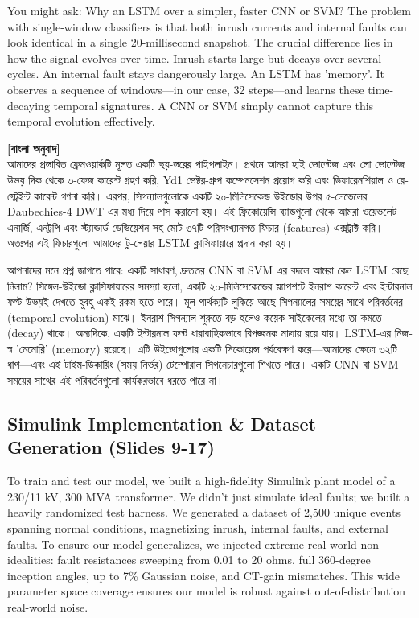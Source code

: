 \documentclass[12pt]{article}
\begin{document}
You might ask: Why an LSTM over a simpler, faster CNN or SVM? The problem with single-window classifiers is that both inrush currents and internal faults can look identical in a single 20-millisecond snapshot. The crucial difference lies in how the signal evolves over time. Inrush starts large but decays over several cycles. An internal fault stays dangerously large. An LSTM has 'memory'. It observes a sequence of windows—in our case, 32 steps—and learns these time-decaying temporal signatures. A CNN or SVM simply cannot capture this temporal evolution effectively.

\begin{bengali}
\textbf{[বাংলা অনুবাদ]} \\
আমাদের প্রস্তাবিত ফ্রেমওয়ার্কটি মূলত একটি ছয়-স্তরের পাইপলাইন। প্রথমে আমরা হাই ভোল্টেজ এবং লো ভোল্টেজ উভয় দিক থেকে ৩-ফেজ কারেন্ট গ্রহণ করি, Yd1 ভেক্টর-গ্রুপ কম্পেনসেশন প্রয়োগ করি এবং ডিফারেনশিয়াল ও রেস্ট্রেইন্ট কারেন্ট গণনা করি। এরপর, সিগন্যালগুলোকে একটি ২০-মিলিসেকেন্ড উইন্ডোর উপর ৫-লেভেলের Daubechies-4 DWT এর মধ্য দিয়ে পাস করানো হয়। এই ফ্রিকোয়েন্সি ব্যান্ডগুলো থেকে আমরা ওয়েভলেট এনার্জি, এনট্রপি এবং স্ট্যান্ডার্ড ডেভিয়েশন সহ মোট ৩৭টি পরিসংখ্যানগত ফিচার (features) এক্সট্রাক্ট করি। অতঃপর এই ফিচারগুলো আমাদের টু-লেয়ার LSTM ক্লাসিফায়ারে প্রদান করা হয়।

আপনাদের মনে প্রশ্ন জাগতে পারে: একটি সাধারণ, দ্রুততর CNN বা SVM এর বদলে আমরা কেন LSTM বেছে নিলাম? সিঙ্গেল-উইন্ডো ক্লাসিফায়ারের সমস্যা হলো, একটি ২০-মিলিসেকেন্ডের স্ন্যাপশটে ইনরাশ কারেন্ট এবং ইন্টারনাল ফল্ট উভয়ই দেখতে হুবহু একই রকম হতে পারে। মূল পার্থক্যটি লুকিয়ে আছে সিগন্যালের সময়ের সাথে পরিবর্তনের (temporal evolution) মাঝে। ইনরাশ সিগন্যাল শুরুতে বড় হলেও কয়েক সাইকেলের মধ্যে তা কমতে (decay) থাকে। অন্যদিকে, একটি ইন্টারনাল ফল্ট ধারাবাহিকভাবে বিপজ্জনক মাত্রায় রয়ে যায়। LSTM-এর নিজস্ব 'মেমোরি' (memory) রয়েছে। এটি উইন্ডোগুলোর একটি সিকোয়েন্স পর্যবেক্ষণ করে—আমাদের ক্ষেত্রে ৩২টি ধাপ—এবং এই টাইম-ডিকায়িং (সময় নির্ভর) টেম্পোরাল সিগনেচারগুলো শিখতে পারে। একটি CNN বা SVM সময়ের সাথের এই পরিবর্তনগুলো কার্যকরভাবে ধরতে পারে না।
\end{bengali}

\subsection*{Simulink Implementation \& Dataset Generation (Slides 9-17)}
To train and test our model, we built a high-fidelity Simulink plant model of a 230/11 kV, 300 MVA transformer. We didn't just simulate ideal faults; we built a heavily randomized test harness. We generated a dataset of 2,500 unique events spanning normal conditions, magnetizing inrush, internal faults, and external faults. To ensure our model generalizes, we injected extreme real-world non-idealities: fault resistances sweeping from 0.01 to 20 ohms, full 360-degree inception angles, up to 7\% Gaussian noise, and CT-gain mismatches. This wide parameter space coverage ensures our model is robust against out-of-distribution real-world noise.
\end{document}
